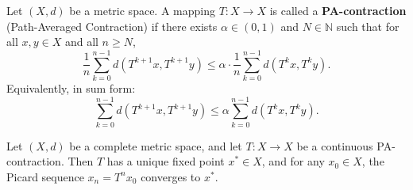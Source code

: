 \documentclass[10pt,a4paper]{amsart}
\begin{document}
\begin{definition}[PA-Contraction]
Let $ (X,d) $ be a metric space. A mapping $ T: X \to X $ is called a \textbf{PA-contraction} (Path-Averaged Contraction) if there exists $ \alpha \in (0,1) $ 
and $ N \in \mathbb{N}$ such that for all $ x, y \in X $ and all $ n \ge N$,
\begin{equation}
\frac{1}{n} \sum_{k=0}^{n-1} d(T^{k+1}x, T^{k+1}y) \leq \alpha \cdot \frac{1}{n} \sum_{k=0}^{n-1} d(T^k x, T^k y).
\label{pa1}
\end{equation}
Equivalently, in sum form:
\begin{equation}
\sum_{k=0}^{n-1} d(T^{k+1}x, T^{k+1}y) \leq \alpha \sum_{k=0}^{n-1} d(T^k x, T^k y).
\label{pa2}
\end{equation}
\end{definition}

\begin{theorem}
Let $ (X,d) $ be a complete metric space, and let $ T: X \to X $ be a continuous PA-contraction. Then $ T $ has a unique fixed point $ x^* \in X $, and for any $ x_0 \in X $, the Picard sequence $ x_n = T^n x_0 $ converges to $ x^* $.
\end{theorem}
\end{document}
